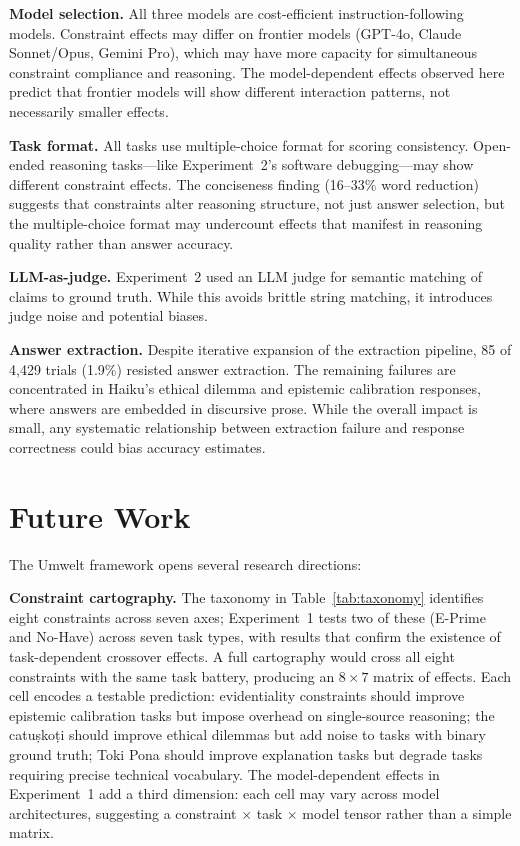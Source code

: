 \documentclass[11pt,a4paper]{article}
\begin{document}
\textbf{Model selection.} All three models are cost-efficient instruction-following models. Constraint effects may differ on frontier models (GPT-4o, Claude Sonnet/Opus, Gemini Pro), which may have more capacity for simultaneous constraint compliance and reasoning. The model-dependent effects observed here predict that frontier models will show different interaction patterns, not necessarily smaller effects.

\textbf{Task format.} All tasks use multiple-choice format for scoring consistency. Open-ended reasoning tasks---like Experiment~2's software debugging---may show different constraint effects. The conciseness finding (16--33\% word reduction) suggests that constraints alter reasoning structure, not just answer selection, but the multiple-choice format may undercount effects that manifest in reasoning quality rather than answer accuracy.

\textbf{LLM-as-judge.} Experiment~2 used an LLM judge for semantic matching of claims to ground truth. While this avoids brittle string matching, it introduces judge noise and potential biases.

\textbf{Answer extraction.} Despite iterative expansion of the extraction pipeline, 85 of 4,429 trials (1.9\%) resisted answer extraction. The remaining failures are concentrated in Haiku's ethical dilemma and epistemic calibration responses, where answers are embedded in discursive prose. While the overall impact is small, any systematic relationship between extraction failure and response correctness could bias accuracy estimates.

\section{Future Work}

The Umwelt framework opens several research directions:

\textbf{Constraint cartography.} The taxonomy in Table~\ref{tab:taxonomy} identifies eight constraints across seven axes; Experiment~1 tests two of these (E-Prime and No-Have) across seven task types, with results that confirm the existence of task-dependent crossover effects. A full cartography would cross all eight constraints with the same task battery, producing an $8 \times 7$ matrix of effects. Each cell encodes a testable prediction: evidentiality constraints should improve epistemic calibration tasks but impose overhead on single-source reasoning; the catu\d{s}ko\d{t}i should improve ethical dilemmas but add noise to tasks with binary ground truth; Toki Pona should improve explanation tasks but degrade tasks requiring precise technical vocabulary. The model-dependent effects in Experiment~1 add a third dimension: each cell may vary across model architectures, suggesting a constraint $\times$ task $\times$ model tensor rather than a simple matrix.
\end{document}
